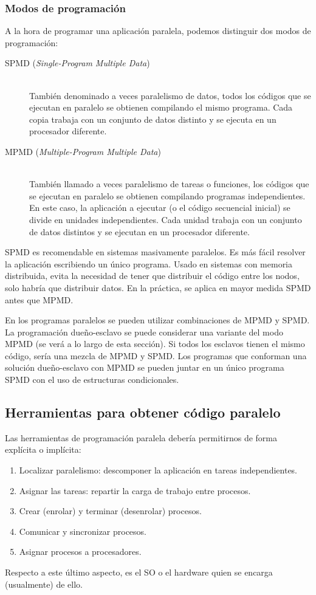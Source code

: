 \subsubsection{Modos de programación}
A la hora de programar una aplicación paralela, podemos distinguir dos modos de programación:
\begin{description}
    \item [SPMD (\emph{Single-Program Multiple Data})]~\\
        También denominado a veces paralelismo de datos, todos los códigos que se ejecutan en paralelo se obtienen compilando el mismo programa. Cada copia trabaja con un conjunto de datos distinto y se ejecuta en un procesador diferente.
    \item [MPMD (\emph{Multiple-Program Multiple Data})]~\\
        También llamado a veces paralelismo de tareas o funciones, los códigos que se ejecutan en paralelo se obtienen compilando programas independientes. En este caso, la aplicación a ejecutar (o el código secuencial inicial) se divide en unidades independientes. Cada unidad trabaja con un conjunto de datos distintos y se ejecutan en un procesador diferente.
\end{description}

SPMD es recomendable en sistemas masivamente paralelos. Es más fácil resolver la aplicación escribiendo un único programa. Usado en sistemas con memoria distribuida, evita la necesidad de tener que distribuir el código entre los nodos, solo habría que distribuir datos. En la práctica, se aplica en mayor medida SPMD antes que MPMD.

En los programas paralelos se pueden utilizar combinaciones de MPMD y SPMD\@. La programación dueño-esclavo se puede considerar una variante del modo MPMD (se verá a lo largo de esta sección). Si todos los esclavos tienen el mismo código, sería una mezcla de MPMD y SPMD\@. Los programas que conforman una solución dueño-esclavo con MPMD se pueden juntar en un único programa SPMD con el uso de estructuras condicionales.

\subsection{Herramientas para obtener código paralelo}
Las herramientas de programación paralela debería permitirnos de forma explícita o implícita:
\begin{enumerate}
    \item Localizar paralelismo: descomponer la aplicación en tareas independientes.
    \item Asignar las tareas: repartir la carga de trabajo entre procesos.
    \item Crear (enrolar) y terminar (desenrolar) procesos.
    \item Comunicar y sincronizar procesos.
    \item Asignar procesos a procesadores.
\end{enumerate}
Respecto a este último aspecto, es el SO o el hardware quien se encarga (usualmente) de ello.\\

